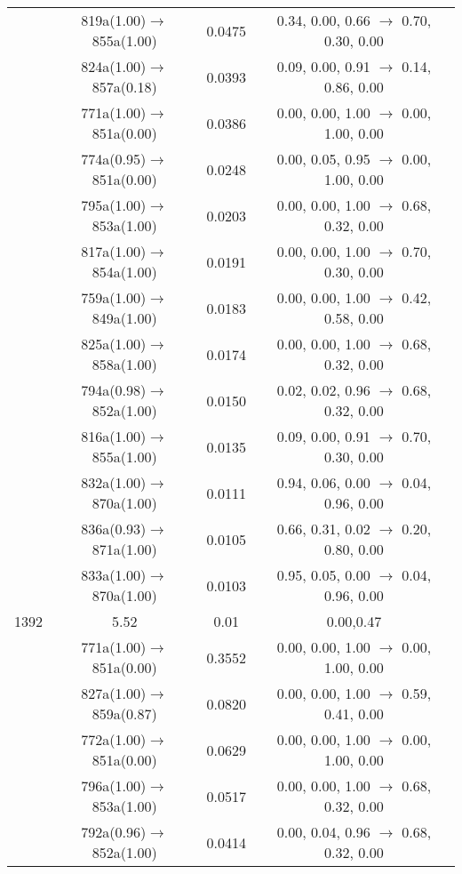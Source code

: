 \documentclass[10pt,a4paper]{article}
\begin{document}
\begin{longtable}{c|c|c|c}
 	& 819a(1.00)$\rightarrow$855a(1.00) &	 0.0475 &	 0.34, 0.00, 0.66 $\rightarrow$ 0.70, 0.30, 0.00 \\ 
 	& 824a(1.00)$\rightarrow$857a(0.18) &	 0.0393 &	 0.09, 0.00, 0.91 $\rightarrow$ 0.14, 0.86, 0.00 \\ 
 	& 771a(1.00)$\rightarrow$851a(0.00) &	 0.0386 &	 0.00, 0.00, 1.00 $\rightarrow$ 0.00, 1.00, 0.00 \\ 
 	& 774a(0.95)$\rightarrow$851a(0.00) &	 0.0248 &	 0.00, 0.05, 0.95 $\rightarrow$ 0.00, 1.00, 0.00 \\ 
 	& 795a(1.00)$\rightarrow$853a(1.00) &	 0.0203 &	 0.00, 0.00, 1.00 $\rightarrow$ 0.68, 0.32, 0.00 \\ 
 	& 817a(1.00)$\rightarrow$854a(1.00) &	 0.0191 &	 0.00, 0.00, 1.00 $\rightarrow$ 0.70, 0.30, 0.00 \\ 
 	& 759a(1.00)$\rightarrow$849a(1.00) &	 0.0183 &	 0.00, 0.00, 1.00 $\rightarrow$ 0.42, 0.58, 0.00 \\ 
 	& 825a(1.00)$\rightarrow$858a(1.00) &	 0.0174 &	 0.00, 0.00, 1.00 $\rightarrow$ 0.68, 0.32, 0.00 \\ 
 	& 794a(0.98)$\rightarrow$852a(1.00) &	 0.0150 &	 0.02, 0.02, 0.96 $\rightarrow$ 0.68, 0.32, 0.00 \\ 
 	& 816a(1.00)$\rightarrow$855a(1.00) &	 0.0135 &	 0.09, 0.00, 0.91 $\rightarrow$ 0.70, 0.30, 0.00 \\ 
 	& 832a(1.00)$\rightarrow$870a(1.00) &	 0.0111 &	 0.94, 0.06, 0.00 $\rightarrow$ 0.04, 0.96, 0.00 \\ 
 	& 836a(0.93)$\rightarrow$871a(1.00) &	 0.0105 &	 0.66, 0.31, 0.02 $\rightarrow$ 0.20, 0.80, 0.00 \\ 
 	& 833a(1.00)$\rightarrow$870a(1.00) &	 0.0103 &	 0.95, 0.05, 0.00 $\rightarrow$ 0.04, 0.96, 0.00 \\ 
 \hline1392 &	 5.52 &	 0.01 &	 0.00,0.47 \\ 
  	& 771a(1.00)$\rightarrow$851a(0.00) &	 0.3552 &	 0.00, 0.00, 1.00 $\rightarrow$ 0.00, 1.00, 0.00 \\ 
 	& 827a(1.00)$\rightarrow$859a(0.87) &	 0.0820 &	 0.00, 0.00, 1.00 $\rightarrow$ 0.59, 0.41, 0.00 \\ 
 	& 772a(1.00)$\rightarrow$851a(0.00) &	 0.0629 &	 0.00, 0.00, 1.00 $\rightarrow$ 0.00, 1.00, 0.00 \\ 
 	& 796a(1.00)$\rightarrow$853a(1.00) &	 0.0517 &	 0.00, 0.00, 1.00 $\rightarrow$ 0.68, 0.32, 0.00 \\ 
 	& 792a(0.96)$\rightarrow$852a(1.00) &	 0.0414 &	 0.00, 0.04, 0.96 $\rightarrow$ 0.68, 0.32, 0.00 \\ 

\end{longtable}
\end{document}
